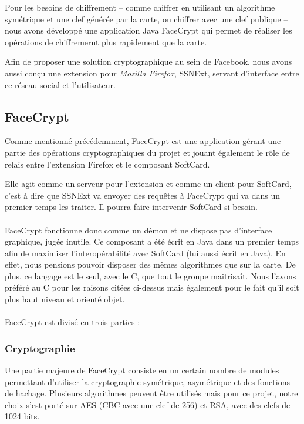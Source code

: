 \documentclass[a4paper,11pt,french]{article}
\begin{document}
Pour les besoins de chiffrement -- comme chiffrer en utilisant un algorithme
symétrique et une clef générée par la carte, ou chiffrer avec une clef
publique -- nous avons développé une application Java \og{}FaceCrypt \fg{}
qui permet de réaliser les opérations de chiffremernt plus rapidement que la
carte.

Afin de proposer une solution cryptographique au sein de Facebook, nous avons 
aussi conçu une extension pour \emph{Mozilla Firefox}, SSNExt, servant 
d'interface entre ce réseau social et l'utilisateur.

\subsection{FaceCrypt}
Comme mentionné précédemment, FaceCrypt est une application gérant une partie
des opérations cryptographiques du projet et jouant également le rôle de
relais entre l'extension Firefox et le composant SoftCard. 

Elle agit comme un serveur pour l'extension et comme un client pour SoftCard, 
c'est à dire que SSNExt va envoyer des requêtes à FaceCrypt qui va dans un 
premier temps les traiter. Il pourra faire intervenir SoftCard si besoin.

\paragraph{}
FaceCrypt fonctionne donc comme un démon et ne dispose pas d'interface
graphique, jugée inutile. Ce composant a été écrit en Java dans un premier 
temps afin de maximiser l'interopérabilité avec SoftCard (lui aussi écrit en 
Java). En effet, nous pensions pouvoir disposer des mêmes algorithmes 
que sur la carte. De plus, ce langage est le seul, avec le C, que tout le
groupe maitrisaît. Nous l'avons préféré au C pour les raisons citées ci-dessus
mais également pour le fait qu'il soit plus haut niveau et orienté objet.

\paragraph{}
FaceCrypt est divisé en trois parties : 

\subsubsection{Cryptographie}
Une partie majeure de FaceCrypt consiste en un certain nombre de modules 
permettant d'utiliser la cryptographie symétrique, asymétrique et des 
fonctions de hachage. Plusieurs algorithmes peuvent être utilisés mais
pour ce projet, notre choix s'est porté sur AES (CBC avec une clef de 256) et 
RSA, avec des clefs de 1024 bits.
\end{document}
